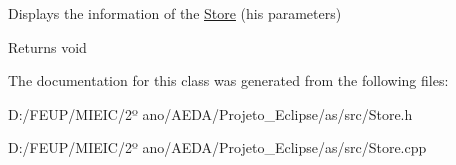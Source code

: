 Displays the information of the \hyperlink{class_store}{Store} (his parameters) 

\begin{DoxyReturn}{Returns}
void 
\end{DoxyReturn}


The documentation for this class was generated from the following files\+:\begin{DoxyCompactItemize}
\item 
D\+:/\+F\+E\+U\+P/\+M\+I\+E\+I\+C/2º ano/\+A\+E\+D\+A/\+Projeto\+\_\+\+Eclipse/as/src/Store.\+h\item 
D\+:/\+F\+E\+U\+P/\+M\+I\+E\+I\+C/2º ano/\+A\+E\+D\+A/\+Projeto\+\_\+\+Eclipse/as/src/Store.\+cpp\end{DoxyCompactItemize}
